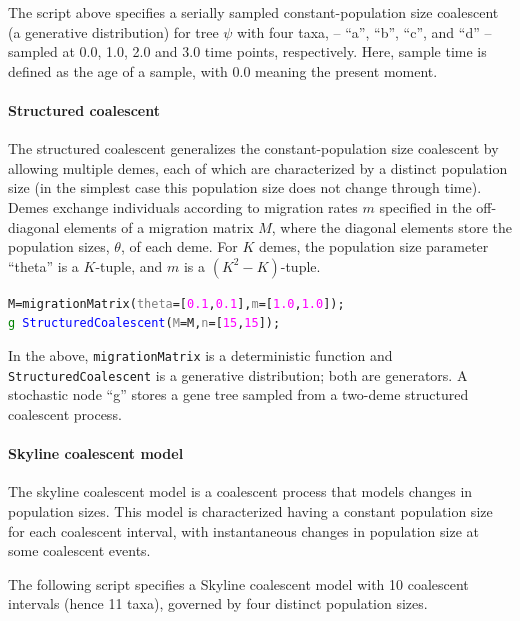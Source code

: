 \documentclass[10pt,letterpaper,table]{article}
\begin{document}
The script above specifies a serially sampled constant-population size coalescent (a generative distribution) for tree $\psi$ with four taxa, -- ``a'', ``b'', ``c'', and ``d'' -- sampled at 0.0, 1.0, 2.0 and 3.0 time points, respectively. Here, sample time is defined as the age of a sample, with 0.0 meaning the present moment.

\paragraph{Structured coalescent}
The structured coalescent \cite{hudson1990oxford, notohara1990coalescent} generalizes the constant-population size coalescent \cite{kingman82} by allowing multiple demes, each of which are characterized by a distinct population size (in the simplest case this population size does not change through time).
Demes exchange individuals according to migration rates $m$ specified in the off-diagonal elements of a migration matrix $M$, where the diagonal elements store the population sizes, $\theta$, of each deme.
For $K$ demes, the population size parameter ``theta'' is a $K$-tuple, and $m$ is a $(K^2-K)$-tuple.

{\small
  \begin{alltt}
    M = \textcolor{magenta!80!black}{migrationMatrix}(\textcolor{gray}{theta}=[\textcolor{magenta}{0.1}, \textcolor{magenta}{0.1}], \textcolor{gray}{m}=[\textcolor{magenta}{1.0}, \textcolor{magenta}{1.0}]);
    \textcolor{green}{g} ~ \textcolor{blue}{StructuredCoalescent}(\textcolor{gray}{M}=M, \textcolor{gray}{n}=[\textcolor{magenta}{15}, \textcolor{magenta}{15}]);
  \end{alltt}
}

In the above, \texttt{migrationMatrix} is a deterministic function and \texttt{StructuredCoalescent} is a generative distribution; both are generators. A stochastic node ``g'' stores a gene tree sampled from a two-deme structured coalescent process.

\paragraph{Skyline coalescent model}
The skyline coalescent model \cite{drummond2005bayesian} is a coalescent process that models changes in population sizes.
This model is characterized having a constant population size for each coalescent interval, with instantaneous changes in population size at some coalescent events.

The following script specifies a Skyline coalescent model with 10 coalescent intervals (hence 11 taxa), governed by four distinct population sizes.
\end{document}
